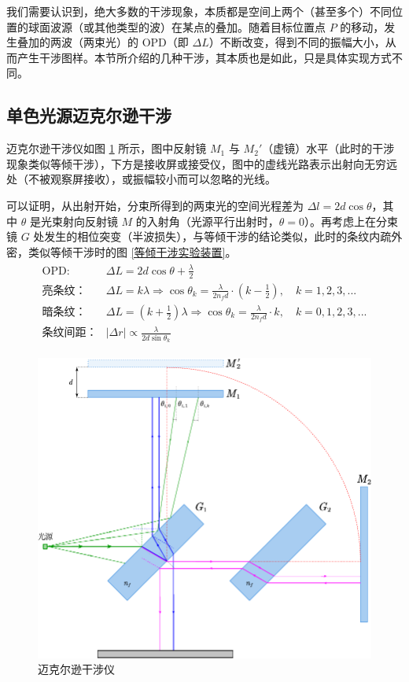 \documentclass[UTF8]{report}
\theoremstyle{MyLineTheoremStyle} %
\theoremstyle{MyBlockTheoremStyle} %
\theoremstyle{MySubsubsectionStyle} %
\begin{document}
我们需要认识到，绝大多数的干涉现象，本质都是空间上两个（甚至多个）不同位置的球面波源（或其他类型的波）在某点的叠加。随着目标位置点 $P$ 的移动，发生叠加的两波（两束光）的 OPD（即 $\Delta L$）不断改变，得到不同的振幅大小，从而产生干涉图样。本节所介绍的几种干涉，其本质也是如此，只是具体实现方式不同。

\subsection{单色光源迈克尔逊干涉}

迈克尔逊干涉仪如图 \ref{迈克尔逊干涉仪} 所示，图中反射镜 $M_1$ 与 $M_2'$（虚镜）水平（此时的干涉现象类似等倾干涉），下方是接收屏或接受仪，图中的虚线光路表示出射向无穷远处（不被观察屏接收），或振幅较小而可以忽略的光线。

可以证明，从出射开始，分束所得到的两束光的空间光程差为 $\Delta l = 2 d \cos \theta$，其中 $\theta$ 是光束射向反射镜 $M$ 的入射角（光源平行出射时，$\theta = 0$）。再考虑上在分束镜 $G$ 处发生的相位突变（半波损失），与等倾干涉的结论类似，此时的条纹内疏外密，类似等倾干涉时的图 \ref{等倾干涉实验装置}。
\begin{align}
\begin{matrix}
\displaystyle \text{OPD: }& \Delta L = 2 d \cos \theta + \frac{\lambda}{2} \\ 
\displaystyle \text{亮条纹：}&\Delta L = k \lambda \Longrightarrow \cos \theta_k = \frac{\lambda}{2 n_f d} \cdot (k - \frac{1}{2}),\quad k = 1, 2, 3, ... \\ 
\displaystyle \text{暗条纹：}&\Delta L = (k + \frac{1}{2}) \lambda \Longrightarrow \cos \theta_k = \frac{\lambda}{2 n_f d} \cdot k,\quad k = 0, 1, 2, 3, ...\\ 
\displaystyle \text{条纹间距：}& | \Delta r | \propto  \frac{\lambda}{2d \sin \theta_k}
\end{matrix}
\end{align}


\begin{figure}[H]\centering
    \includegraphics[width=0.8\columnwidth]{assets/3/迈克尔逊干涉仪.pdf}
    \caption{ 迈克尔逊干涉仪}\label{迈克尔逊干涉仪}
\end{figure}
\end{document}
